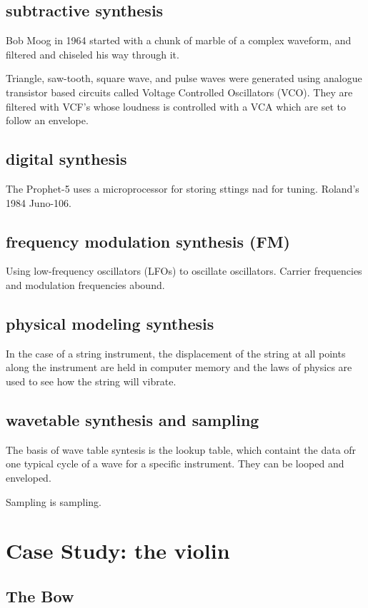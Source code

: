 \documentclass[10pt, a4paper, twocolumn]{article}
\begin{document}
\subsection{subtractive synthesis}
Bob Moog in 1964 started with a chunk of marble of a complex waveform, and filtered and chiseled his way through it.

Triangle, saw-tooth, square wave, and pulse waves were generated using analogue transistor based circuits called Voltage Controlled Oscillators (VCO). They are filtered with VCF's whose loudness is controlled with a VCA which are set to follow an envelope.

\subsection{digital synthesis}
The Prophet-5 uses a microprocessor for storing sttings nad for tuning. Roland's 1984 Juno-106.

\subsection{frequency modulation synthesis (FM)}
Using low-frequency oscillators (LFOs) to oscillate oscillators. Carrier frequencies and modulation frequencies abound.

\subsection{physical modeling synthesis}
In the case of a string instrument, the displacement of the string at all points along the instrument are held in computer memory and the laws of physics are used to see how the string will vibrate.

\subsection{wavetable synthesis and sampling}
The basis of wave table syntesis is the lookup table, which containt the data ofr one typical cycle of a wave for a specific instrument. They can be looped and enveloped.

Sampling is sampling.

\section{Case Study: the violin}

\subsection{The Bow}
\end{document}
